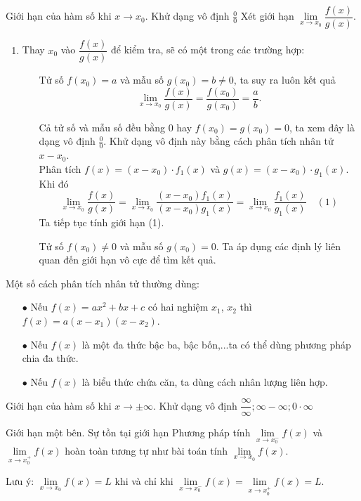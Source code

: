 \begin{dang}{Giới hạn của hàm số khi $x \to x_0$. Khử dạng vô định $\displaystyle\frac{0}{0}$ }
	Xét giới hạn $\lim\limits_{x\to x_0}\dfrac{f(x)}{g(x)}$.
	\begin{enumerate}[\iconMT]
		\item {} Thay $x_0$ vào $\dfrac{f(x)}{g(x)}$ để kiểm tra, sẽ có một trong các trường hợp:
		\begin{itemize}
			\item [\ding{172}] Tử số $f(x_0)=a$ và mẫu số $g(x_0)=b \ne 0$,  ta suy ra luôn kết quả $$\lim\limits_{x\to x_0}\dfrac{f(x)}{g(x)}=\dfrac{f(x_0)}{g(x_0)}=\dfrac{a}{b}.$$
			\item [\ding{173}]  Cả tử số và mẫu số đều bằng 0 hay $f(x_0)=g(x_0)=0$, ta xem đây là dạng vô định $\displaystyle\frac{0}{0}$. Khử dạng vô định này bằng cách phân tích nhân tử $x-x_0$.\\
			Phân tích $f(x)=(x-x_0) \cdot f_1(x)$ và $g(x)=(x-x_0) \cdot g_1(x)$. Khi đó
			$$\lim\limits_{x\to x_0}\frac{f(x)}{g(x)}=\lim\limits_{x\to x_0}\frac{(x-x_0)f_1(x)}{(x-x_0)g_1(x)}=\lim\limits_{x\to x_0}\frac{f_1(x)}{g_1(x)} \quad (1)$$
			Ta tiếp tục tính giới hạn (1).
			\item [\ding{174}] Tử số $f(x_0) \ne 0$ và mẫu số $g(x_0)=0$. Ta áp dụng các định lý liên quan đến giới hạn vô cực để tìm kết quả.
		\end{itemize}
	\end{enumerate}
	\begin{luuy}
		Một số cách phân tích nhân tử thường dùng:
		\begin{itemize}
			\item [$\bullet$] Nếu $f(x)=ax^2+bx+c$ có hai nghiệm $x_1$, $x_2$ thì $f(x)=a(x-x_1)(x-x_2)$.
			\item [$\bullet$] Nếu $f(x)$ là một đa thức bậc ba, bậc bốn,...ta có thể dùng phương pháp chia đa thức.
			\item [$\bullet$] Nếu $f(x)$ là biểu thức chứa căn, ta dùng cách nhân lượng liên hợp.	
		\end{itemize}
	\end{luuy}
\end{dang}

\begin{dang}{Giới hạn của hàm số khi $x \to \pm \infty$. Khử dạng vô định $\dfrac{\infty }{\infty };\infty -\infty ;0\cdot\infty$}
\end{dang}


\begin{dang}{Giới hạn một bên. Sự tồn tại giới hạn}
	Phương pháp tính $\lim\limits_{x\to x_0^-}f(x)$ và $\lim\limits_{x\to x_0^+}f(x)$ hoàn toàn tương tự như bài toán tính $\lim\limits_{x\to x_0} f(x)$.
	\begin{luuy}
		Lưu ý: $\lim\limits_{x\to x_0} f(x)=L$ khi và chỉ khi $\lim\limits_{x\to x_0^-}f(x)=\lim\limits_{x\to x_0^+}f(x)=L$.
	\end{luuy}
\end{dang}

